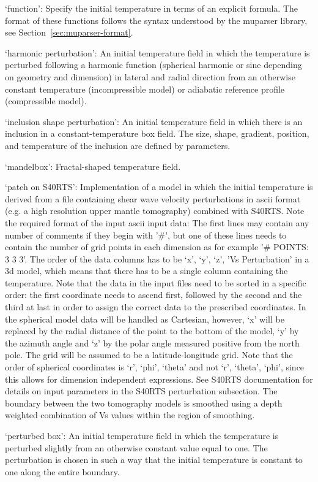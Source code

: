 \begin{itemize}
`function': Specify the initial temperature in terms of an explicit formula. The format of these functions follows the syntax understood by the muparser library, see Section~\ref{sec:muparser-format}.

`harmonic perturbation': An initial temperature field in which the temperature is perturbed following a harmonic function (spherical harmonic or sine depending on geometry and dimension) in lateral and radial direction from an otherwise constant temperature (incompressible model) or adiabatic reference profile (compressible model).

`inclusion shape perturbation': An initial temperature field in which there is an inclusion in a constant-temperature box field. The size, shape, gradient, position, and temperature of the inclusion are defined by parameters.

`mandelbox': Fractal-shaped temperature field.

`patch on S40RTS': Implementation of a model in which the initial temperature is derived from a file containing shear wave velocity perturbations in ascii format (e.g. a high resolution upper mantle tomography) combined with S40RTS. Note the required format of the input ascii input data: The first lines may contain any number of comments if they begin with '#', but one of these lines needs to contain the number of grid points in each dimension as for example '# POINTS: 3 3 3'. The order of the data columns has to be  `x', `y', `z', 'Vs Perturbation' in a 3d model, which means that there has to be a single column containing the temperature. Note that the data in the input files need to be sorted in a specific order: the first coordinate needs to ascend first, followed by the second and the third at last in order to assign the correct data to the prescribed coordinates. In the spherical model data will be handled as Cartesian, however, `x' will be replaced by the radial distance of the point to the bottom of the model, `y' by the azimuth angle and `z' by the polar angle measured positive from the north pole. The grid will be assumed to be a latitude-longitude grid. Note that the order of spherical coordinates is `r', `phi', `theta' and not `r', `theta', `phi', since this allows for dimension independent expressions. See S40RTS documentation for details on input parameters in the S40RTS perturbation subsection. The boundary between the two tomography models is smoothed using a depth weighted combination of Vs values within the region of smoothing. 

`perturbed box': An initial temperature field in which the temperature is perturbed slightly from an otherwise constant value equal to one. The perturbation is chosen in such a way that the initial temperature is constant to one along the entire boundary.


\end{itemize}
